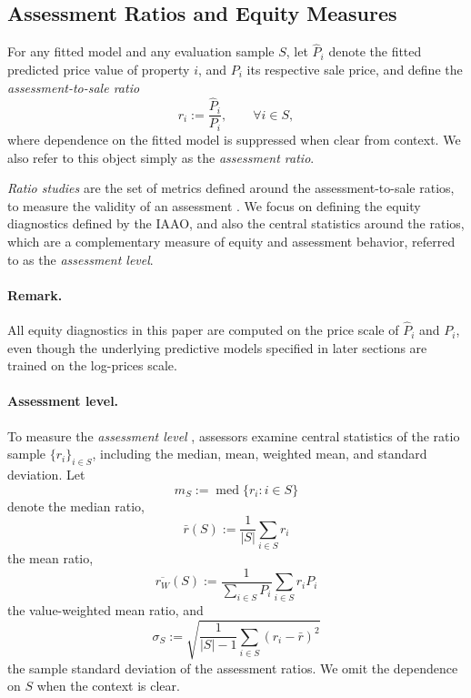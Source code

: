 \documentclass[12pt, draft]{article}
\theoremstyle{plain}
\theoremstyle{definition}
\newcommand{\1}{\mathbf{1}}
\begin{document}
\subsection{Assessment Ratios and Equity Measures}
\label{subsec:equity_metrics}

For any fitted model and any evaluation sample $S$, let $\widehat P_i$ denote the fitted predicted price value of property $i$, and $P_i$ its respective sale price, and define the \emph{assessment-to-sale ratio}
\begin{equation}
\label{eq:ratio_def}
r_i := \frac{\widehat P_i}{P_i},
\qquad \forall i\in S,
\end{equation}
where dependence on the fitted model is suppressed when clear from context. We also refer to this object simply as the \textit{assessment ratio}.

\textit{Ratio studies} are the set of metrics defined around the assessment-to-sale ratios, to measure the validity of an assessment \cite{IAAO2025ExposureRatio}. We focus on defining the equity diagnostics defined by the IAAO, and also the central statistics around the ratios, which are a complementary measure of equity and assessment behavior, referred to as the \textit{assessment level}. 

\paragraph{Remark.} All equity diagnostics in this paper are computed on the price scale of $\widehat P_i$ and $P_i$, even though the underlying predictive models specified in later sections are trained on the log-prices scale.

\paragraph{Assessment level.}
To measure the \textit{assessment level} \cite{IAAO2025ExposureRatio}, assessors examine central statistics of the ratio sample $\{r_i\}_{i\in S}$, including the median, mean, weighted mean, and standard deviation. Let
\[
m_S := \operatorname{med}\{r_i: i\in S\}
\]
denote the median ratio,
\[
\bar r (S) := \frac{1}{|S|}\sum_{i\in S} r_i
\]
the mean ratio,
\[
\overline{r_W} (S) := \frac{1}{\sum_{i\in S} P_i}\sum_{i\in S} r_i P_i
\]
the value-weighted mean ratio, and
\[
\sigma_S := \sqrt{\frac{1}{|S|-1}\sum_{i\in S}(r_i-\bar r)^2}
\]
the sample standard deviation of the assessment ratios. We omit the dependence on $S$ when the context is clear.
\end{document}
